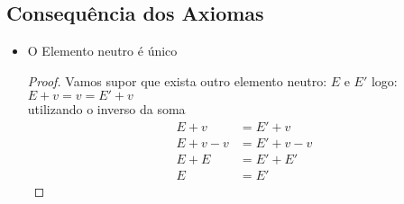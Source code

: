 \documentclass{article}
\theoremstyle{plain}
\theoremstyle{definition}
\theoremstyle{remark}
\numberwithin{equation}{section}
\numberwithin{thm}{section}
\begin{document}
\subsection*{Consequência dos Axiomas}
\begin{itemize}
	\item O Elemento neutro é único  \begin{proof}
	  		Vamos supor que exista outro  elemento neutro: \(E \text{ e } E'\) logo: \( E + v = v = E' + v\)\\
	  		utilizando o inverso da soma
	  		\begin{align*}
	  		E + v &= E' + v \\
	  		E + v - v &= E' + v - v \\
	  		E + E &= E ' + E' \\
	  		E &= E'
	  		\end{align*}
					  		
	  		
	  \end{proof}


\end{itemize}
\end{document}

